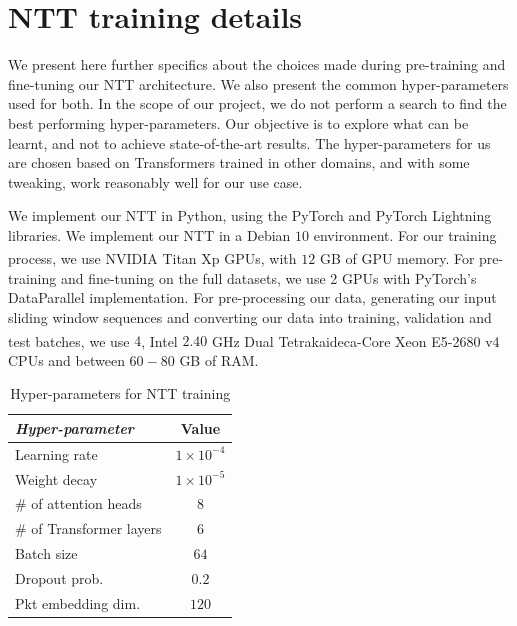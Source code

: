 \chapter{NTT training details}
\label{app:a}

We present here further specifics about the choices made during pre-training and fine-tuning our NTT architecture. We also present the common hyper-parameters used for both. In the scope of our project, we do not perform a search to find the best performing hyper-parameters. Our objective is to explore what can be learnt, and not to achieve state-of-the-art results. The hyper-parameters for us are chosen based on Transformers trained in other domains, and with some tweaking, work reasonably well for our use case.

We implement our NTT in Python, using the PyTorch\cite{pytorch} and PyTorch Lightning\cite{pytorchlit} libraries. We implement our NTT in a Debian $10$ environment. For our training process, we use NVIDIA\textsuperscript{\textregistered} Titan Xp GPUs, with $12$ GB of GPU memory. For pre-training and fine-tuning on the full datasets, we use 2 GPUs with PyTorch's DataParallel implementation. For pre-processing our data, generating our input sliding window sequences and converting our data into training, validation and test batches, we use $4$, Intel\textsuperscript{\textregistered} $2.40$ GHz Dual Tetrakaideca-Core Xeon E5-2680 v4 CPUs and   between $60-80$ GB of RAM. 

\begin{table}[htbp]
\centering
\begin{tabular}{ l   c  }
\toprule
\emph{Hyper-parameter} & Value  \\
                                                       
\midrule
 Learning rate                                         &     $1\times10^{-4}$           \\
 Weight decay					  &       $1\times10^{-5}$          \\
 \# of attention heads 			  &          $8$      \\
 \# of Transformer layers			  &          $6$        \\
 Batch size 			  		&            $64$      \\
 Dropout prob.					&            $0.2$   \\
 Pkt embedding dim.			&                   $120$     \\
    
\bottomrule

\end{tabular}
\caption{Hyper-parameters for NTT training}
\label{app:table1}
\end{table}

